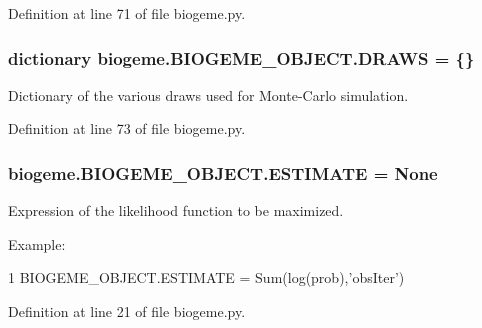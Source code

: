 Definition at line 71 of file biogeme.\+py.

\subsubsection[{\texorpdfstring{D\+R\+A\+WS}{DRAWS}}]{\setlength{\rightskip}{0pt plus 5cm}dictionary biogeme.\+B\+I\+O\+G\+E\+M\+E\+\_\+\+O\+B\+J\+E\+C\+T.\+D\+R\+A\+WS = \{\}\hspace{0.3cm}{\ttfamily [static]}}\hypertarget{classbiogeme_1_1_b_i_o_g_e_m_e___o_b_j_e_c_t_a720bc8b02eeff67ec92a4963d508ff7c}{}\label{classbiogeme_1_1_b_i_o_g_e_m_e___o_b_j_e_c_t_a720bc8b02eeff67ec92a4963d508ff7c}


Dictionary of the various draws used for Monte-\/\+Carlo simulation. 



Definition at line 73 of file biogeme.\+py.

\subsubsection[{\texorpdfstring{E\+S\+T\+I\+M\+A\+TE}{ESTIMATE}}]{\setlength{\rightskip}{0pt plus 5cm}biogeme.\+B\+I\+O\+G\+E\+M\+E\+\_\+\+O\+B\+J\+E\+C\+T.\+E\+S\+T\+I\+M\+A\+TE = None\hspace{0.3cm}{\ttfamily [static]}}\hypertarget{classbiogeme_1_1_b_i_o_g_e_m_e___o_b_j_e_c_t_a3e2437d2271f3f9fe27913e1e1312c47}{}\label{classbiogeme_1_1_b_i_o_g_e_m_e___o_b_j_e_c_t_a3e2437d2271f3f9fe27913e1e1312c47}


Expression of the likelihood function to be maximized. 

Example\+:
\begin{DoxyCode}
1 BIOGEME\_OBJECT.ESTIMATE = Sum(log(prob),\textcolor{stringliteral}{'obsIter'}) 
\end{DoxyCode}
 

Definition at line 21 of file biogeme.\+py.

